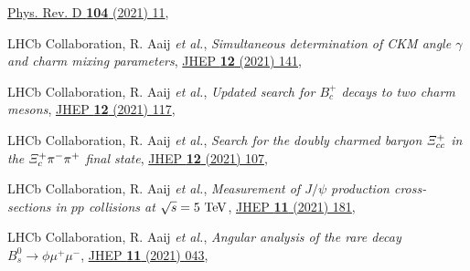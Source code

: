 \begin{cvcontent}
\begin{enumerate}[label={[\arabic*]}, leftmargin=1.5cm]
    \href{https://link.aps.org/doi/10.1103/PhysRevD.104.112008}{Phys. Rev. D \textbf{104} (2021) 11},
    \item LHCb Collaboration, R. Aaij \emph{et al.}, 
    \emph{Simultaneous determination of CKM angle $\gamma$ and charm mixing parameters},
    \href{https://doi.org/10.1007/JHEP12(2021)141}{JHEP \textbf{12} (2021) 141},
    \sloppy
    \item LHCb Collaboration, R. Aaij \emph{et al.}, 
    \emph{Updated search for $B_c^+$ decays to two charm mesons},
    \href{https://doi.org/10.1007/JHEP12(2021)117}{JHEP \textbf{12} (2021) 117},
    \item LHCb Collaboration, R. Aaij \emph{et al.}, 
    \emph{Search for the doubly charmed baryon $\it{\Xi}_{cc}^{+}$ in the $\it{\Xi}_{c}^{+} \pi^{-} \pi^{+}$ final state},
    \href{https://doi.org/10.1007/JHEP12(2021)107}{JHEP \textbf{12} (2021) 107},
    \item LHCb Collaboration, R. Aaij \emph{et al.}, 
    \emph{Measurement of $J/\psi$ production cross-sections in $pp$ collisions at $\sqrt{s}=5~\rm{TeV}$},
    \href{http://dx.doi.org/10.1007/JHEP11(2021)181}{JHEP \textbf{11} (2021) 181},
    \sloppy
    \item LHCb Collaboration, R. Aaij \emph{et al.}, 
    \emph{Angular analysis of the rare decay $B_s^0 \to \phi \mu^+ \mu^-$},
    \href{http://dx.doi.org/10.1007/JHEP11(2021)043}{JHEP \textbf{11} (2021) 043},
  \end{enumerate}
\end{cvcontent}